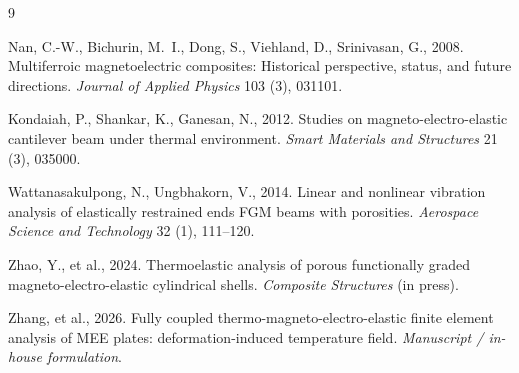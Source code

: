 \documentclass[11pt,a4paper]{ctexart}
\begin{document}
\begin{thebibliography}{9}

Nan, C.-W., Bichurin, M.~I., Dong, S., Viehland, D., Srinivasan, G., 2008.
Multiferroic magnetoelectric composites: Historical perspective, status, and future directions.
\textit{Journal of Applied Physics} 103 (3), 031101.

Kondaiah, P., Shankar, K., Ganesan, N., 2012.
Studies on magneto-electro-elastic cantilever beam under thermal environment.
\textit{Smart Materials and Structures} 21 (3), 035000.

Wattanasakulpong, N., Ungbhakorn, V., 2014.
Linear and nonlinear vibration analysis of elastically restrained ends FGM beams with porosities.
\textit{Aerospace Science and Technology} 32 (1), 111--120.

Zhao, Y., et al., 2024.
Thermoelastic analysis of porous functionally graded magneto-electro-elastic cylindrical shells.
\textit{Composite Structures} (in press).

Zhang, et al., 2026.
Fully coupled thermo-magneto-electro-elastic finite element analysis of MEE plates: deformation-induced temperature field.
\textit{Manuscript / in-house formulation}.

\end{thebibliography}
\end{document}
